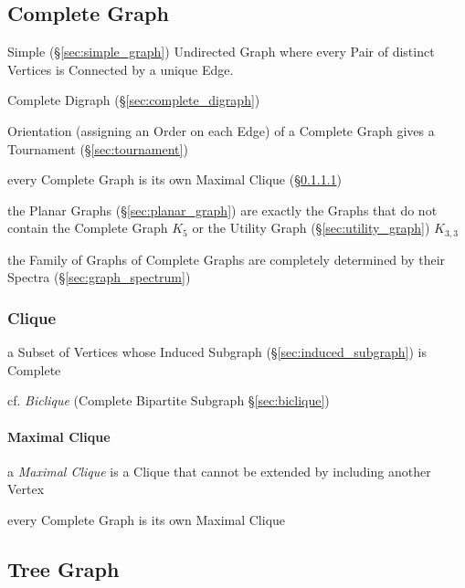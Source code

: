 \subsection{Complete Graph}\label{sec:complete_graph}

Simple (\S\ref{sec:simple_graph}) Undirected Graph where every Pair of
distinct Vertices is Connected by a unique Edge.

Complete Digraph (\S\ref{sec:complete_digraph})

Orientation (assigning an Order on each Edge) of a Complete Graph
gives a Tournament (\S\ref{sec:tournament})

every Complete Graph is its own Maximal Clique (\S\ref{sec:maximal_clique})

the Planar Graphs (\S\ref{sec:planar_graph}) are exactly the Graphs that do not
contain the Complete Graph $K_5$ or the Utility Graph
(\S\ref{sec:utility_graph}) $K_{3,3}$

the Family of Graphs of Complete Graphs are completely determined by their
Spectra (\S\ref{sec:graph_spectrum})



\subsubsection{Clique}\label{sec:clique}

a Subset of Vertices whose Induced Subgraph (\S\ref{sec:induced_subgraph}) is
Complete

cf. \emph{Biclique} (Complete Bipartite Subgraph \S\ref{sec:biclique})



\paragraph{Maximal Clique}\label{sec:maximal_clique}\hfill

a \emph{Maximal Clique} is a Clique that cannot be extended by including
another Vertex

every Complete Graph is its own Maximal Clique



\subsection{Tree Graph}\label{sec:tree_graph}

